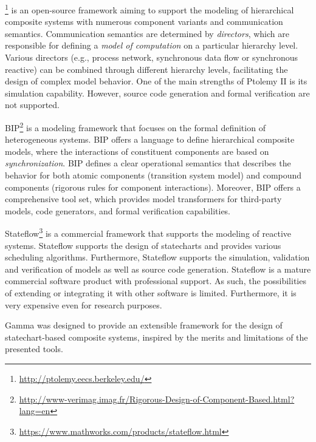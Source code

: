 \ptolemy\footnote{\url{http://ptolemy.eecs.berkeley.edu/}} \cite{ptolemy,ptolemy2} is an open-source framework aiming to support
the modeling of hierarchical composite systems with numerous component variants and communication semantics. Communication semantics are determined by \emph{directors}, which are responsible for defining a \emph{model of computation} on a particular hierarchy level. Various directors (e.g., process network, synchronous data flow
or synchronous reactive) can be combined through different hierarchy levels, facilitating the design of complex model behavior. One of the main strengths of Ptolemy II is its simulation capability. However, source code generation and formal verification are not supported.

BIP\footnote{\url{http://www-verimag.imag.fr/Rigorous-Design-of-Component-Based.html?lang=en}} \cite{bip,bip3} is a modeling framework that focuses on the formal definition of heterogeneous systems.
BIP offers a language to define hierarchical composite models, where the interactions of constituent components are based on \emph{synchronization}. BIP defines a clear operational semantics that describes the behavior for both atomic components (transition system model) and compound components (rigorous rules for component interactions). Moreover, BIP offers a comprehensive tool set, which provides model transformers for third-party models, code generators, and formal
verification capabilities.

Stateflow\footnote{\url{https://www.mathworks.com/products/stateflow.html}} \cite{stateflow} is a commercial framework that supports the modeling of
reactive systems. Stateflow supports the design of
statecharts and provides various scheduling
algorithms. Furthermore, Stateflow supports the simulation, validation and verification of models as well as source code generation. Stateflow is a mature commercial software product with professional
support. As such, the possibilities of extending or integrating it with other software is limited. Furthermore, it is very expensive even for research purposes.

Gamma was designed to provide an extensible framework for the design of statechart-based composite systems, inspired by the merits and limitations of the presented tools. 


